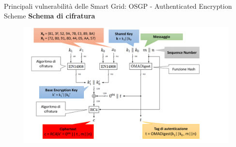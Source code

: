 \begin{frame}{Principali vulnerabilità delle Smart Grid: OSGP - Authenticated Encryption Scheme}
	\textbf{Schema di cifratura}
	\begin{figure}[h] 
		\includegraphics[scale=0.3,cfbox=blue_slides 1pt 0pt]{imgs/schemes/scheme-1(info).png}
	\end{figure}
\end{frame}

